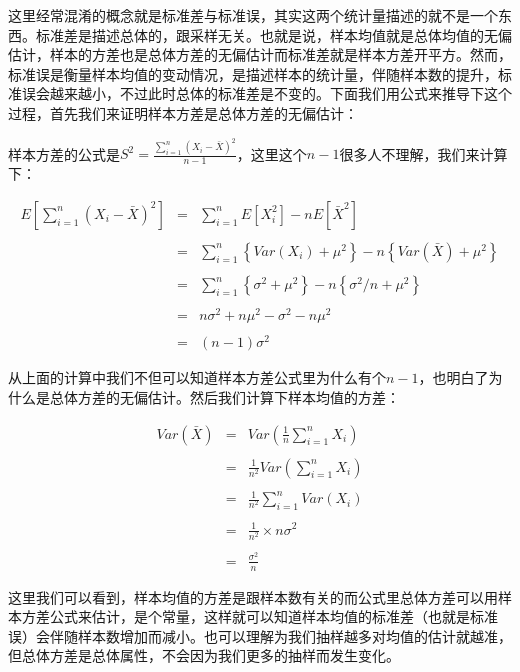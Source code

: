 \documentclass[]{tufte-book}
\begin{document}
这里经常混淆的概念就是标准差与标准误，其实这两个统计量描述的就不是一个东西。标准差是描述总体的，跟采样无关。也就是说，样本均值就是总体均值的无偏估计，样本的方差也是总体方差的无偏估计而标准差就是样本方差开平方。然而，标准误是衡量样本均值的变动情况，是描述样本的统计量，伴随样本数的提升，标准误会越来越小，不过此时总体的标准差是不变的。下面我们用公式来推导下这个过程，首先我们来证明样本方差是总体方差的无偏估计：

样本方差的公式是\(S^2 = \frac{\sum_{i=1}^n (X_i - \bar X)^2}{n-1}\)，这里这个\(n-1\)很多人不理解，我们来计算下：

\begin{eqnarray*}
    E\left[\sum_{i=1}^n (X_i - \bar X)^2\right] & = & \sum_{i=1}^n E\left[X_i^2\right] - n E\left[\bar X^2\right] \\ \\
    & = & \sum_{i=1}^n \left\{Var(X_i) + \mu^2\right\} - n \left\{Var(\bar X) + \mu^2\right\} \\ \\
    & = & \sum_{i=1}^n \left\{\sigma^2 + \mu^2\right\} - n \left\{\sigma^2 / n + \mu^2\right\} \\ \\
    & = & n \sigma^2 + n \mu ^ 2 - \sigma^2 - n \mu^2 \\ \\
    & = & (n - 1) \sigma^2
\end{eqnarray*}

从上面的计算中我们不但可以知道样本方差公式里为什么有个\(n-1\)，也明白了为什么是总体方差的无偏估计。然后我们计算下样本均值的方差：

\begin{eqnarray*}
    Var(\bar X) & = & Var \left( \frac{1}{n}\sum_{i=1}^n X_i \right)\\ \\
    & = & \frac{1}{n^2} Var\left(\sum_{i=1}^n X_i \right)\\ \\
    & = & \frac{1}{n^2} \sum_{i=1}^n Var(X_i) \\ \\
    & = & \frac{1}{n^2} \times n\sigma^2 \\ \\
    & = & \frac{\sigma^2}{n}
\end{eqnarray*}

这里我们可以看到，样本均值的方差是跟样本数有关的而公式里总体方差可以用样本方差公式来估计，是个常量，这样就可以知道样本均值的标准差（也就是标准误）会伴随样本数增加而减小。也可以理解为我们抽样越多对均值的估计就越准，但总体方差是总体属性，不会因为我们更多的抽样而发生变化。
\end{document}
